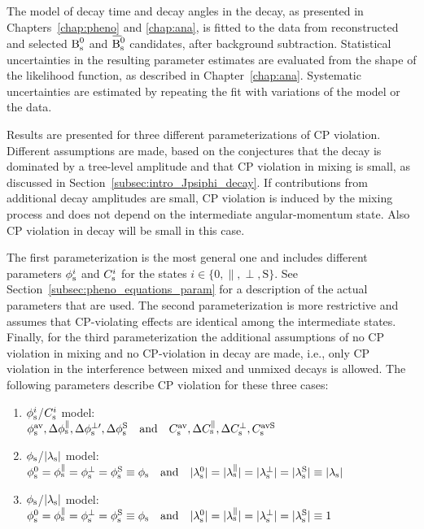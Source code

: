 The model of decay time and decay angles in the \BstoJpsiKK{} decay, as presented in Chapters~\ref{chap:pheno} and \ref{chap:ana}, is
fitted to the data from reconstructed and selected $\Bs$ and $\Bsbar$ candidates, after background subtraction. Statistical uncertainties
in the resulting parameter estimates are evaluated from the shape of the likelihood function, as described in Chapter~\ref{chap:ana}.
Systematic uncertainties are estimated by repeating the fit with variations of the model or the data.

Results are presented for three different parameterizations of CP violation. Different assumptions are made, based on the conjectures that
the \BstoJpsiKK{} decay is dominated by a tree-level amplitude and that CP violation in mixing is small, as discussed in
Section~\ref{subsec:intro_Jpsiphi_decay}. If contributions from additional decay amplitudes are small, CP violation is induced by the
\BsBsbar{} mixing process and does not depend on the intermediate angular-momentum state. Also CP violation in decay will be small in this
case.

The first parameterization is the most general one and includes different parameters $\phisi$ and $\Csi$ for the states $i\in\{\text{0},
\parallel, \perp, \text{S}\}$. See Section~\ref{subsec:pheno_equations_param} for a description of the actual parameters that are used. The
second parameterization is more restrictive and assumes that CP-violating effects are identical among the intermediate states. Finally, for
the third parameterization the additional assumptions of no CP violation in mixing and no CP-violation in decay are made, i.e., only CP
violation in the interference between mixed and unmixed decays is allowed. The following parameters describe CP violation for these three
cases:
\begin{enumerate}
  \item $\phisi$/$\Csi$ model:\\
      $\phisav,\Delphispara,\Delphisperpp,\DelphisS
      \quad\text{and}\quad\Csav,\DelCspara,\DelCsperp,\CsavS$
  \item $\phis$/$\lamsAbs$ model:\\
      $\phisi[\text{0}]=\phisi[\parallel]=\phisi[\perp]=\phisi[\text{S}]\equiv\phis
      \quad\text{and}\quad\lamsiAbs[\text{0}]=\lamsiAbs[\parallel]=\lamsiAbs[\perp]=\lamsiAbs[\text{S}]\equiv\lamsAbs$
  \item $\phis$/$\lamsAbs$ model:\\
      $\phisi[\text{0}]=\phisi[\parallel]=\phisi[\perp]=\phisi[\text{S}]\equiv\phis
      \quad\text{and}\quad\lamsiAbs[\text{0}]=\lamsiAbs[\parallel]=\lamsiAbs[\perp]=\lamsiAbs[\text{S}]\equiv1$
\end{enumerate}

